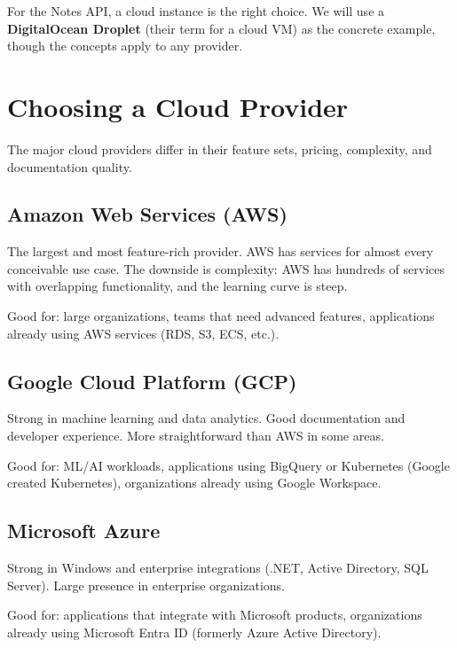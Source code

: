 \noindent{}For the Notes API, a cloud instance is the right choice. We will use a \textbf{DigitalOcean Droplet} (their term for a cloud VM) as the concrete example, though the concepts apply to any provider.

\setcounter{section}{2}
\section{Choosing a Cloud Provider}\label{20-server-fundamentals:203-choosing-a-cloud-provider}

The major cloud providers differ in their feature sets, pricing, complexity, and documentation quality.

\subsection*{Amazon Web Services (AWS)}\label{20-server-fundamentals:amazon-web-services-aws}

The largest and most feature-rich provider. AWS has services for almost every conceivable use case. The downside is complexity: AWS has hundreds of services with overlapping functionality, and the learning curve is steep.

Good for: large organizations, teams that need advanced features, applications already using AWS services (RDS, S3, ECS, etc.).

\subsection*{Google Cloud Platform (GCP)}\label{20-server-fundamentals:google-cloud-platform-gcp}

Strong in machine learning and data analytics. Good documentation and developer experience. More straightforward than AWS in some areas.

Good for: ML/AI workloads, applications using BigQuery or Kubernetes (Google created Kubernetes), organizations already using Google Workspace.

\subsection*{Microsoft Azure}\label{20-server-fundamentals:microsoft-azure}

Strong in Windows and enterprise integrations (.NET, Active Directory, SQL Server). Large presence in enterprise organizations.

Good for: applications that integrate with Microsoft products, organizations already using Microsoft Entra ID (formerly Azure Active Directory).

